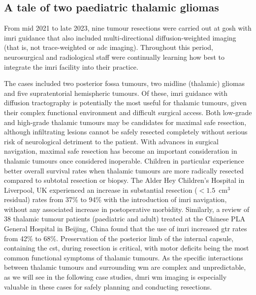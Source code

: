 \clearpage
\subsection{A tale of two paediatric thalamic gliomas}\label{sec:case}

From mid 2021 to late 2023, nine tumour resections were carried out at \gls{gosh} with \gls{imri} guidance that also included multi-directional diffusion-weighted imaging (that is, not trace-weighted or \gls{adc} imaging).
Throughout this period, neurosurgical and radiological staff were continually learning how best to integrate the \gls{imri} facility into their practice.

The cases included two posterior fossa tumours, two midline (thalamic) gliomas and five supratentorial hemispheric tumours.
Of these, \gls{imri} guidance with diffusion tractography is potentially the most useful for thalamic tumours, given their complex functional environment and difficult surgical access.
Both low-grade \autocite{Wong2016} and high-grade\autocite{Dorfer2021} thalamic tumours may be candidates for maximal safe resection, although infiltrating lesions cannot be safely resected completely without serious risk of neurological detriment to the patient.
With advances in surgical navigation, maximal safe resection has become an important consideration in thalamic tumours once considered inoperable\autocite{Souweidane1996,Puget2007,Steinbok2016,Grewal2019,Sunderland2021}.
Children in particular\autocite{Ferroli2023} experience better overall survival rates when thalamic tumours are more radically resected compared to subtotal resection or biopsy\autocite{Cinalli2018}.
The Alder Hey Children's Hospital in Liverpool, UK experienced an increase in substantial resection ($<1.5$~cm$^3$ residual) rates from 37\% to 94\% with the introduction of \gls{imri} navigation, without any associated increase in postoperative morbidity\autocite{Sunderland2021}.
Similarly, a review of 38 thalamic tumour patients (paediatric and adult) treated at the Chinese PLA General Hospital in Beijing, China found that the use of \gls{imri} increased \gls{gtr} rates from 42\% to 68\%\autocite{Zheng2016}.
Preservation of the posterior limb of the internal capsule, containing the \gls{cst}, during resection is critical, with motor deficits being the most common functional symptoms of thalamic tumours\autocite{Puget2007, Zheng2016, Palmisciano2021}.
As the specific interactions between thalamic tumours and surrounding \gls{wm} are complex and unpredictable, as we will see in the following case studies, \gls{dmri} \gls{wm} imaging is especially valuable in these cases for safely planning and conducting resections\autocite{Celtikci2017}.

